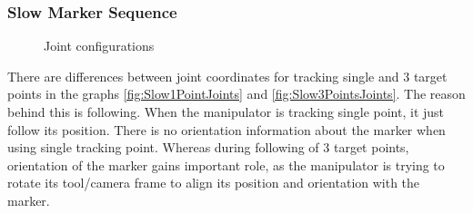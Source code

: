 \documentclass[]{scrartcl}
\begin{document}
\subsubsection*{Slow Marker Sequence}
\begin{figure}[!htp]
	\hfill
	\caption{Joint configurations}
	\label{fig:SlowSequenceJoints}
\end{figure}
There are differences between joint coordinates for tracking single and 3 target points in the graphs \ref{fig:Slow1PointJoints} and \ref{fig:Slow3PointsJoints}. The reason behind this is following. When the manipulator is tracking single point, it just follow its position. There is no orientation information about the marker when using single tracking point. Whereas during following of 3 target points, orientation of the marker gains important role, as the manipulator is trying to rotate its tool/camera frame to align its position and orientation with the marker. 
\end{document}
